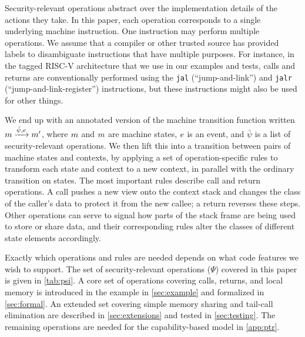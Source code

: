 \documentclass[10pt,conference]{ieeetran}%
\theoremstyle{definition}
\begin{document}
Security-relevant operations abstract over the implementation details of the
actions they take. In this paper, each operation corresponds to a
single underlying machine instruction. One instruction may perform multiple
operations. We assume that a compiler or other trusted source has provided
labels to disambiguate instructions that have multiple purposes. For instance,
in the tagged RISC-V architecture
that we use in our examples and tests,
calls and returns are conventionally performed using the {\tt jal}
(``jump-and-link'')
and {\tt jalr} (``jump-and-link-register'') instructions, but these
instructions might also be used for other things.

We end up with an annotated version of the
machine transition function written \(m \xrightarrow{\bar{\psi},
  e} m'\), where \(m\) and \(m\) are machine states, \(e\) is
an event, and \(\bar{\psi}\) is a list of security-relevant operations.
%
We then lift this into a transition between pairs of machine states and contexts,
by applying a set of operation-specific rules to transform each state and context to
a new context, in parallel with the ordinary transition on states.
The most important rules describe call and return operations.
A call pushes a new view onto the context stack and changes the class of the
caller's data to protect it from the new callee; a return reverses these steps.
Other operations can serve to signal how parts of the stack frame are being used to store
or share data, and their corresponding rules alter the classes of different
state elements accordingly.

Exactly which operations and rules are needed depends on
what code features we wish to support.
The set of security-relevant operations (\(\Psi\)) covered in this paper is given in
\cref{tab:psi}. A core set of operations covering calls, returns, and local
memory is introduced in the example in \cref{sec:example}
and formalized in \cref{sec:formal}. An extended set covering simple memory sharing and
tail-call elimination are described in \cref{sec:extensions} and tested in \cref{sec:testing}.
The remaining operations are needed for the capability-based model in \cref{app:ptr}. 

\newcommand{\example}{\rowcolor{black!0}}
\newcommand{\testing}{\rowcolor{black!10}}
\newcommand{\theory}{\rowcolor{black!25}}
\end{document}
